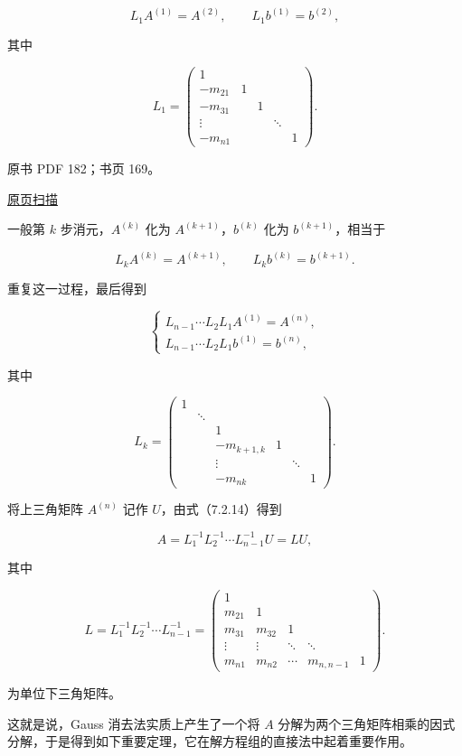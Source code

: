\documentclass[
  10pt,
  fontset=fandol]{ctexart}
\begin{document}
\[L_1A^{(1)}=A^{(2)},\qquad L_1b^{(1)}=b^{(2)},\]

其中

\[
L_1=\begin{pmatrix}
1&&&&\\
-m_{21}&1&&&\\
-m_{31}&&1&&\\
\vdots&&&\ddots&\\
-m_{n1}&&&&1
\end{pmatrix}.
\]

\clearpage

原书 PDF 182；书页 169。

\href{../../../source-images/pdf-182.jpeg}{原页扫描}

一般第 \(k\) 步消元，\(A^{(k)}\) 化为 \(A^{(k+1)}\)，\(b^{(k)}\) 化为 \(b^{(k+1)}\)，相当于

\[L_kA^{(k)}=A^{(k+1)},\qquad L_kb^{(k)}=b^{(k+1)}.\]

重复这一过程，最后得到

\[
\begin{cases}
L_{n-1}\cdots L_2L_1A^{(1)}=A^{(n)},\\
L_{n-1}\cdots L_2L_1b^{(1)}=b^{(n)},
\end{cases}
\tag{7.2.14}
\]

其中

\[
L_k=\begin{pmatrix}
1&&&&&\\
&\ddots&&&&\\
&&1&&&\\
&&-m_{k+1,k}&1&&\\
&&\vdots&&\ddots&\\
&&-m_{nk}&&&1
\end{pmatrix}.
\]

将上三角矩阵 \(A^{(n)}\) 记作 \(U\)，由式（7.2.14）得到

\[A=L_1^{-1}L_2^{-1}\cdots L_{n-1}^{-1}U=LU,\]

其中

\[
L=L_1^{-1}L_2^{-1}\cdots L_{n-1}^{-1}
=\begin{pmatrix}
1&&&&\\
m_{21}&1&&&\\
m_{31}&m_{32}&1&&\\
\vdots&\vdots&\ddots&\ddots&\\
m_{n1}&m_{n2}&\cdots&m_{n,n-1}&1
\end{pmatrix}.
\]

为单位下三角矩阵。

这就是说，Gauss 消去法实质上产生了一个将 \(A\) 分解为两个三角矩阵相乘的因式分解，于是得到如下重要定理，它在解方程组的直接法中起着重要作用。
\end{document}
